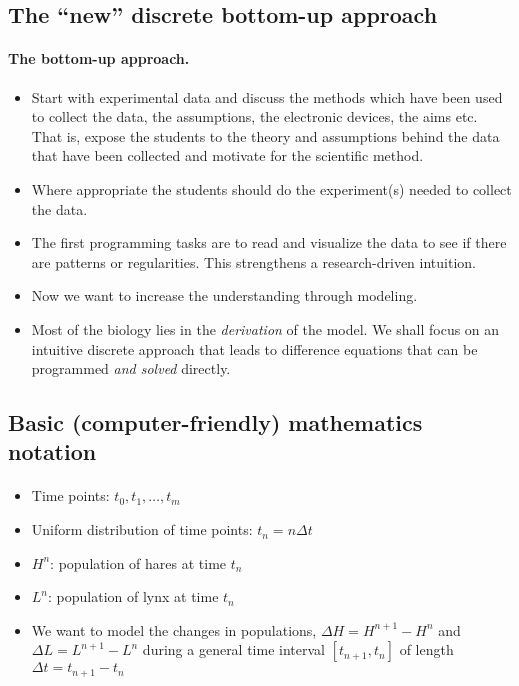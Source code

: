 \documentclass[%
twoside,                 %
final,                   %
10pt]{article}
\begin{document}
\subsection*{The ``new'' discrete bottom-up approach}


\paragraph{The bottom-up approach.}
\begin{itemize}
 \item Start with experimental data and discuss the methods which have been used to collect the data, the assumptions, the electronic devices, the aims etc. That is, expose the students to the theory and assumptions behind the data that have been collected and motivate for the scientific method.

 \item Where appropriate the students should do the experiment(s) needed to collect the data.

 \item The first programming tasks are to read and visualize the data to see if there are patterns or regularities. This strengthens a research-driven intuition.

 \item Now we want to increase the understanding through modeling.

 \item Most of the biology lies in the \emph{derivation} of the model. We shall
   focus on an intuitive discrete approach that leads to difference
   equations that can be programmed \emph{and solved} directly.
\end{itemize}

\noindent



\subsection*{Basic (computer-friendly) mathematics notation}

\paragraph{}
\begin{itemize}
 \item Time points: $t_0,t_1,\ldots,t_m$

 \item Uniform distribution of time points: $t_n=n\Delta t$

 \item $H^n$: population of hares at time $t_n$

 \item $L^n$: population of lynx at time $t_n$

 \item We want to model the changes in populations, $\Delta H=H^{n+1}-H^n$
   and $\Delta L=L^{n+1}-L^n$ during a general time interval $[t_{n+1},t_n]$
   of length $\Delta t=t_{n+1}-t_n$
\end{itemize}
\end{document}
